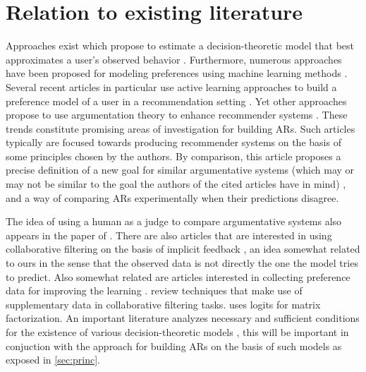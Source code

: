 \documentclass[version=3.21, pagesize, twoside=off, bibliography=totoc, DIV=calc, fontsize=12pt, a4paper, french, english]{scrartcl}
\begin{document}
\section{Relation to existing literature}
\label{sec:litt}
Approaches exist which propose to estimate a decision-theoretic model that best approximates a user’s observed behavior \citep{greco_trends_2010, sobrie_learning_2018}. 
Furthermore, numerous approaches have been proposed for modeling preferences using machine learning methods \citep{furnkranz_preference_2010}. 
Several recent articles in particular use active learning approaches to build a preference model of a user in a recommendation setting \citep{teso_constructive_2016, teso_coactive_2017, dragone_constructive_2018, erculiani_automating_2018, dragone_no_2018}.
Yet other approaches propose to use argumentation theory to enhance recommender systems \citep{chesnevar_empowering_2009, rago_argumentation-based_2018}. These trends constitute promising areas of investigation for building \acp{AR}. Such articles typically are focused towards producing  recommender systems on the basis of some principles chosen by the authors. By comparison, this article proposes a precise definition of a new goal for similar argumentative systems (which may or may not be similar to the goal the authors of the cited articles have in mind) , and a way of comparing \acp{AR} experimentally when their predictions disagree.

The idea of using a human as a judge to compare argumentative systems also appears in the paper of \citet{irving_ai_2018}.
There are also articles that are interested in using collaborative filtering on the basis of implicit feedback \citep{rendle_bpr:_2009, hu_collaborative_2008}, an idea somewhat related to ours in the sense that the observed data is not directly the one the model tries to predict.
Also somewhat related are articles interested in collecting preference data for improving the learning \citep{sepliarskaia_preference_2018}. \citet{chen_attribute-aware_2018} review techniques that make use of supplementary data in collaborative filtering tasks.
\citet{johnson_logistic_2014} uses logits for matrix factorization. 
An important literature analyzes necessary and sufficient conditions for the existence of various decision-theoretic models \citep{krantz_foundations_1971, gonzales_additive_1996, bouyssou_consolidated_2015}, this will be important in conjuction with the approach for building \acp{AR} on the basis of such models as exposed in \cref{sec:princ}.
\end{document}
